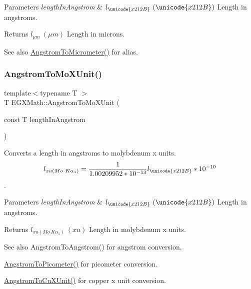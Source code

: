 \begin{DoxyParams}{Parameters}
{\em length\+In\+Angstrom} & $ l_{\unicode{x212B}}\ (\unicode{x212B})$ Length in angstroms. \\
\hline
\end{DoxyParams}
\begin{DoxyReturn}{Returns}
$ l_{\mu m}\ (\mu m)$ Length in microns. 
\end{DoxyReturn}
\begin{DoxySeeAlso}{See also}
\mbox{\hyperlink{group___e_g_x_math-_conversions-_length_conversions-_non-_s_i-_angstrom-_s_i_gab15b376d5a5fc7896a5f5cb6278f782c}{Angstrom\+To\+Micrometer()}} for alias. 
\end{DoxySeeAlso}
\mbox{\label{group___e_g_x_math-_conversions-_length_conversions-_non-_s_i-_angstrom-_non-_s_i_ga197c8294d73fcc3171cd05fc595816c4}} 
\subsubsection{\texorpdfstring{Angstrom\+To\+Mo\+X\+Unit()}{AngstromToMoXUnit()}}
{\footnotesize\ttfamily template$<$typename T $>$ \\
T E\+G\+X\+Math\+::\+Angstrom\+To\+Mo\+X\+Unit (\begin{DoxyParamCaption}\item[{const T}]{length\+In\+Angstrom }\end{DoxyParamCaption})}



Converts a length in angstroms to molybdenum x units. \[ l_{xu(Mo\ K\alpha_1)}=\frac{1}{1.00209952*10^{-13}} l_{\unicode{x212B}} * 10^{-10}\]. 


\begin{DoxyParams}{Parameters}
{\em length\+In\+Angstrom} & $ l_{\unicode{x212B}}\ (\unicode{x212B})$ Length in angstroms. \\
\hline
\end{DoxyParams}
\begin{DoxyReturn}{Returns}
$ l_{xu(Mo\ K\alpha_1)}\ (xu)$ Length in molybdenum x units. 
\end{DoxyReturn}
\begin{DoxySeeAlso}{See also}
Angstrom\+To\+Angstrom() for angstrom conversion. 

\mbox{\hyperlink{group___e_g_x_math-_conversions-_length_conversions-_non-_s_i-_angstrom-_s_i_ga59612970b9b51a1a900a76789ffaaf28}{Angstrom\+To\+Picometer()}} for picometer conversion. 

\mbox{\hyperlink{group___e_g_x_math-_conversions-_length_conversions-_non-_s_i-_angstrom-_non-_s_i_gaf42d486942a8441d13065d8e13661ec6}{Angstrom\+To\+Cu\+X\+Unit()}} for copper x unit conversion. 
\end{DoxySeeAlso}
